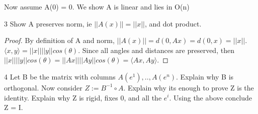 \documentclass{article}
\newcommand{\angles}[1]{\langle #1 \rangle}
\begin{document}
Now assume A(0) = 0. We show A is linear and lies in O(n)

\bigskip

\begin{PROB}{3}\label{Problem 3.}
    Show A preserves norm, ie $||A(x)|| = ||x||$, and dot product. 
\end{PROB}
\begin{proof}
    By definition of A and norm, $||A(x)|| = d(0, Ax) = d(0,x) = ||x||$. 
    $\angles{x, y} = ||x||||y||cos(\theta)$. Since all angles and distances are preserved, then $||x||||y||cos(\theta) = ||Ax||||Ay||cos(\theta) = \angles{Ax, Ay}$.
\end{proof}

\bigskip

\begin{PROB}{4}\label{Problem 4.}
    Let B be the matrix with columns $A(e^1),..,A(e^n)$. Explain why B is orthogonal. Now consider $Z:= B^{-1} \circ A$. Explain why its enough to prove Z is the identity.  Explain why Z is rigid, fixes 0, and all the $e^i$. Using the above conclude Z = I. 
\end{PROB}
\end{document}
